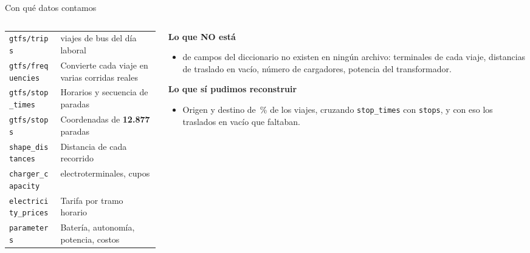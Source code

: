 \documentclass[aspectratio=169,11pt]{beamer}
\begin{document}
\begin{frame}{Con qué datos contamos}
  \scriptsize
  \begin{columns}[t]
    \begin{column}{0.56\textwidth}
      \begin{tabular}{@{}L{2.5cm} L{4.4cm}@{}}
         &  \\
        \midrule
        \texttt{gtfs/trips} & \registrosViaje{} viajes de bus del día laboral \\
        \texttt{gtfs/frequencies} & Convierte cada viaje en varias corridas reales \\
        \texttt{gtfs/stop\_times} & Horarios y secuencia de paradas \\
        \texttt{gtfs/stops} & Coordenadas de \textbf{12.877} paradas \\
        \texttt{shape\_distances} & Distancia de cada recorrido \\
        \texttt{charger\_capacity} & \numElectroterminales{} electroterminales, \cuposTotales{} cupos \\
        \texttt{electricity\_prices} & Tarifa por tramo horario \\
        \texttt{parameters} & Batería, autonomía, potencia, costos \\
        \bottomrule
      \end{tabular}
    \end{column}
    \begin{column}{0.42\textwidth}
      {\color{critred}\bfseries\small Lo que NO está}
      \begin{itemize}\scriptsize
        \item \camposAusentes{} de \camposDocumentados{} campos del diccionario
              no existen en ningún archivo: terminales de cada viaje, distancias
              de traslado en vacío, número de cargadores, potencia del
              transformador.
      \end{itemize}
      \vspace{4pt}
      {\color{ink}\bfseries\small Lo que sí pudimos reconstruir}
      \begin{itemize}\scriptsize
        \item Origen y destino de \pctGeoReconstruido{}\,\% de los viajes,
              cruzando \texttt{stop\_times} con \texttt{stops}, y con eso los
              traslados en vacío que faltaban.
      \end{itemize}
    \end{column}
  \end{columns}
\end{frame}
\end{document}
